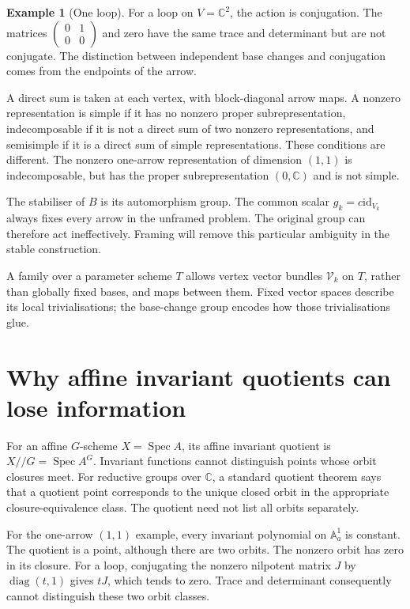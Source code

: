 \documentclass[11pt,a4paper]{article}
\numberwithin{equation}{section}
\theoremstyle{definition}
\newtheorem{example}[definition]{Example}
\newcommand{\A}{\mathbb A}
\newcommand{\Spec}{\operatorname{Spec}}
\newcommand{\id}{\mathrm{id}}
\begin{document}
\begin{example}[One loop]
For a loop on $V=\mathbb C^2$, the action is conjugation. The
matrices $\left(\begin{smallmatrix}0&1\\0&0\end{smallmatrix}\right)$
and zero have the same trace and determinant but are not conjugate.
The distinction between independent base changes and conjugation
comes from the endpoints of the arrow.
\end{example}

A direct sum is taken at each vertex, with block-diagonal arrow maps.
A nonzero representation is simple if it has no nonzero proper
subrepresentation, indecomposable if it is not a direct sum of two
nonzero representations, and semisimple if it is a direct sum of
simple representations. These conditions are different. The nonzero
one-arrow representation of dimension $(1,1)$ is indecomposable,
but has the proper subrepresentation $(0,\mathbb C)$ and is not simple.

The stabiliser of $B$ is its automorphism group. The common scalar
$g_k=c\id_{V_k}$ always fixes every arrow in the unframed problem.
The original group can therefore act ineffectively. Framing will
remove this particular ambiguity in the stable construction.

A family over a parameter scheme $T$ allows vertex vector bundles
$\mathcal V_k$ on $T$, rather than globally fixed bases, and maps
between them. Fixed vector spaces describe its local trivialisations;
the base-change group encodes how those trivialisations glue.

\section{Why affine invariant quotients can lose information}
\label{sec:quotients}

For an affine $G$-scheme $X=\Spec A$, its affine invariant quotient is
$X/\!/G=\Spec A^G$. Invariant functions cannot distinguish points
whose orbit closures meet. For reductive groups over $\mathbb C$, a
standard quotient theorem says that a quotient point corresponds to
the unique closed orbit in the appropriate closure-equivalence class.
The quotient need not list all orbits separately.

For the one-arrow $(1,1)$ example, every invariant polynomial on
$\A^1_a$ is constant. The quotient is a point, although there are
two orbits. The nonzero orbit has zero in its closure. For a loop,
conjugating the nonzero nilpotent matrix $J$ by $\operatorname{diag}(t,1)$
gives $tJ$, which tends to zero. Trace and determinant consequently
cannot distinguish these two orbit classes.
\end{document}
